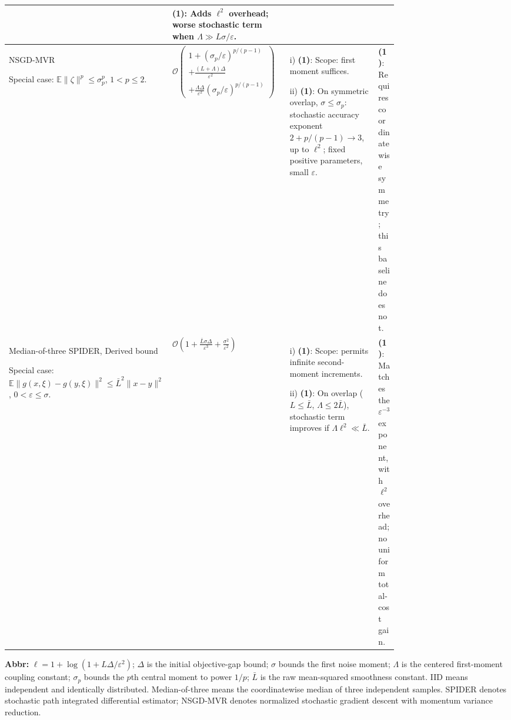 \begin{table}[tp]
\begin{threeparttable}
\begin{tabularx}{\linewidth}{@{}>{\raggedright\arraybackslash}p{0.20\linewidth}>{\raggedright\arraybackslash}p{0.32\linewidth}>{\raggedright\arraybackslash}p{0.25\linewidth}>{\raggedright\arraybackslash}X@{}}
& \textbf{(1)}: Adds $\ell^2$ overhead; worse stochastic term when $\Lambda\gg L\sigma/\varepsilon$. \\
\midrule
NSGD-MVR \citep[Thm.~4.2, $q=1$]{mshFradin2026v2}\par Special case: $\mathbb{E}\|\zeta\|^p\le\sigma_p^p$, $1<p\le2$.
& $\mathcal{O}\!\left(\begin{gathered}1+(\sigma_p/\varepsilon)^{p/(p-1)}\\+\frac{(L+\Lambda)\Delta}{\varepsilon^2}\\+\frac{\Lambda\Delta}{\varepsilon^2}(\sigma_p/\varepsilon)^{p/(p-1)}\end{gathered}\right)$
& i) \textbf{(1)}: Scope: first moment suffices.\par ii) \textbf{(1)}: On symmetric overlap, $\sigma\le\sigma_p$: stochastic accuracy exponent $2+p/(p-1)\to3$, up to $\ell^2$; fixed positive parameters, small $\varepsilon$.
& \textbf{(1)}: Requires coordinatewise symmetry; this baseline does not. \\
\midrule
Median-of-three SPIDER, Derived bound \citep[Thm.~1]{esnFang2018v2}\par Special case: $\mathbb{E}\|g(x,\xi)-g(y,\xi)\|^2\le\bar L^2\|x-y\|^2$, $0<\varepsilon\le\sigma$.
& $\mathcal{O}\!\left(1+\frac{\bar L\sigma\Delta}{\varepsilon^3}+\frac{\sigma^2}{\varepsilon^2}\right)$
& i) \textbf{(1)}: Scope: permits infinite second-moment increments.\par ii) \textbf{(1)}: On overlap ($L\le\bar L$, $\Lambda\le2\bar L$), stochastic term improves if $\Lambda\ell^2\ll\bar L$.
& \textbf{(1)}: Matches the $\varepsilon^{-3}$ exponent, with $\ell^2$ overhead; no uniform total-cost gain. \\
\bottomrule
\end{tabularx}
\begin{tablenotes}[flushleft]\footnotesize
\item[] \textbf{Abbr:} $\ell=1+\log(1+L\Delta/\varepsilon^2)$; $\Delta$ is the initial objective-gap bound; $\sigma$ bounds the first noise moment; $\Lambda$ is the centered first-moment coupling constant; $\sigma_p$ bounds the $p$th central moment to power $1/p$; $\bar L$ is the raw mean-squared smoothness constant. IID means independent and identically distributed. Median-of-three means the coordinatewise median of three independent samples. SPIDER denotes stochastic path integrated differential estimator; NSGD-MVR denotes normalized stochastic gradient descent with momentum variance reduction.
\end{tablenotes}
\end{threeparttable}
\end{table}
\clearpage
